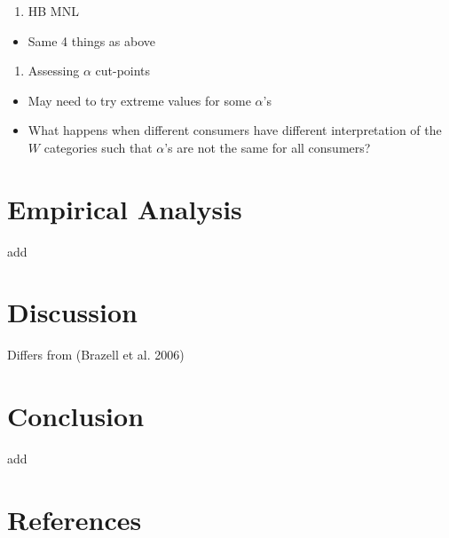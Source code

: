 \documentclass[
  letterpaper,
  DIV=11,
  numbers=noendperiod]{scrartcl}
\providecommand{\tightlist}{%
  \setlength{\itemsep}{0pt}\setlength{\parskip}{0pt}}\usepackage{longtable,booktabs,array}
\begin{document}
\begin{enumerate}
\def\labelenumi{\arabic{enumi}.}
\tightlist
\item
  HB MNL
\end{enumerate}

\begin{itemize}
\tightlist
\item
  Same 4 things as above
\end{itemize}

\begin{enumerate}
\def\labelenumi{\arabic{enumi}.}
\tightlist
\item
  Assessing \(\alpha\) cut-points
\end{enumerate}

\begin{itemize}
\tightlist
\item
  May need to try extreme values for some \(\alpha\)'s
\item
  What happens when different consumers have different interpretation of
  the \(W\) categories such that \(\alpha\)'s are not the same for all
  consumers?
\end{itemize}

\section{Empirical Analysis}\label{sec-analysis}

add

\section{Discussion}\label{sec-discussion}

Differs from (Brazell et al. 2006)

\section{Conclusion}\label{sec-conclusion}

add

\section*{References}\label{references}
\end{document}
